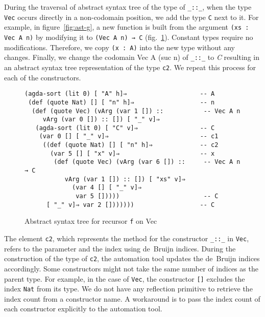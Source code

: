 \documentclass[sigplan,10pt]{acmart}
\begin{document}
\normalsize

During the traversal of abstract syntax tree of the type of {\tt \_::\_}, when the type {\tt Vec} occurs directly in a non-codomain position, we add the type {\tt C} next to it. For example, in figure~\ref{fig:ast-g}, a new function is built from the argument {\tt (xs : Vec A n)} by modifying it to {\tt (Vec A n) → C} (fig.~\ref{fig:ast-d}). Constant types require no modifications. Therefore, we copy {\tt (x : A)} into the new type without any changes. Finally, we change the codomain {Vec A (suc n)} of {\tt \_::\_} to \emph{C} resulting in an abstract syntax tree representation of the type {\tt c2}. We repeat this process for each of the constructors.

\begin{figure}
\begin{center}
\begingroup
\fontsize{7pt}{9pt}\selectfont
\begin{Verbatim}[frame = single]
(agda-sort (lit 0) [ "A" h]⇒                    -- A
 (def (quote Nat) [] [ "n" h]⇒                  -- n
  (def (quote Vec) (vArg (var 1 []) ::           -- Vec A n
     vArg (var 0 []) :: []) [ "_" v]⇒
   (agda-sort (lit 0) [ "C" v]⇒                 -- C
    (var 0 [] [ "_" v]⇒                         -- c1
     ((def (quote Nat) [] [ "n" h]⇒             -- c2
       (var 5 [] [ "x" v]⇒                      -- x
        (def (quote Vec) (vArg (var 6 []) ::     -- Vec A n → C
           vArg (var 1 []) :: []) [ "xs" v]⇒  
             (var 4 [] [ "_" v]⇒ 
              var 5 []))))                       -- C
      [ "_" v]⇒ var 2 []))))))                  -- C
\end{Verbatim}
\endgroup
\end{center}
\caption{Abstract syntax tree for recursor {\tt f} on Vec}
\label{fig:ast-d}
\end{figure}
\normalsize

The element {\tt c2}, which represents the method for the constructor {\tt \_::\_} in {\tt Vec}, refers to the parameter and the index using de~Bruijn indices. During the construction of the type of {\tt c2}, the automation tool updates the de~Bruijn indices accordingly. Some constructors might not take the same number of indices as the parent type. For example, in the case of {\tt Vec}, the constructor {\tt []} excludes the index {\tt Nat} from its type. We do not have any reflection primitive to retrieve the index count from a constructor name. A workaround is to pass the index count of each constructor explicitly to the automation tool.
\end{document}
